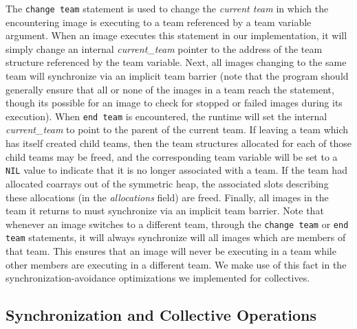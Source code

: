 The \texttt{change team} statement is used to change the \textit{current team}
in which the encountering image is executing to a team referenced by a team
variable argument. When an image executes this statement in our
implementation, it will simply change an internal \textit{current\_team}
pointer to the address of the team structure referenced by the team variable.
Next, all images changing to the same team will synchronize via an implicit
team barrier (note that the program should generally ensure that
all or none of the images in a team reach the statement, though its possible
for an image to check for stopped or failed images during its execution). When
\texttt{end team} is encountered, the runtime will set the internal
\textit{current\_team} to point to the parent of the current team. If leaving
a team which has itself created child teams, then the team structures
allocated for each of those child teams may be freed, and the corresponding
team variable will be set to a \texttt{NIL} value to indicate that it is no
longer associated with a team. If the team had allocated coarrays out of the
symmetric heap, the associated slots describing these allocations (in the
\textit{allocations} field) are freed.  Finally, all images in the team it
returns to must synchronize via an implicit team barrier. Note that whenever
an image switches to a different team, through the \texttt{change team} or
\texttt{end team} statements, it will always synchronize will all images which
are members of that team. This ensures that an image will never be executing
in a team while other members are executing in a different team. We make use
of this fact in the synchronization-avoidance optimizations we implemented for
collectives.

\subsection{Synchronization and Collective Operations}\label{sec:collectives}

